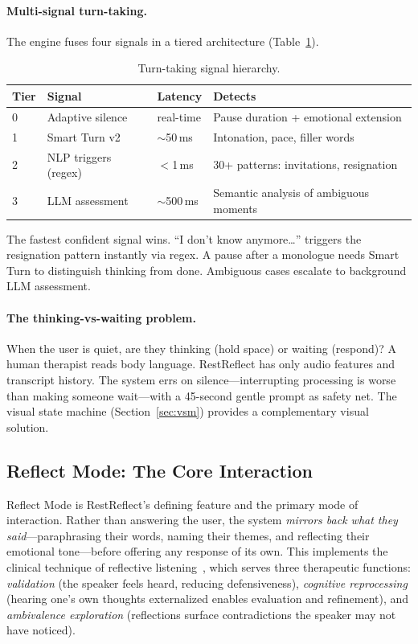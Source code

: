 \documentclass{article}
\begin{document}
\paragraph{Multi-signal turn-taking.} The engine fuses four signals in a tiered architecture (Table~\ref{tab:signals}).

\begin{table}[h]
\centering
\small
\caption{Turn-taking signal hierarchy.}
\label{tab:signals}
\begin{tabular}{@{}llll@{}}
\toprule
Tier & Signal & Latency & Detects \\
\midrule
0 & Adaptive silence & real-time & Pause duration + emotional extension \\
1 & Smart Turn v2 & $\sim$50\,ms & Intonation, pace, filler words \\
2 & NLP triggers (regex) & $<$1\,ms & 30+ patterns: invitations, resignation \\
3 & LLM assessment & $\sim$500\,ms & Semantic analysis of ambiguous moments \\
\bottomrule
\end{tabular}
\end{table}

The fastest confident signal wins. ``I don't know anymore\ldots'' triggers the resignation pattern instantly via regex. A pause after a monologue needs Smart Turn to distinguish thinking from done. Ambiguous cases escalate to background LLM assessment.

\paragraph{The thinking-vs-waiting problem.} When the user is quiet, are they thinking (hold space) or waiting (respond)? A human therapist reads body language. RestReflect has only audio features and transcript history. The system errs on silence---interrupting processing is worse than making someone wait---with a 45-second gentle prompt as safety net. The visual state machine (Section~\ref{sec:vsm}) provides a complementary visual solution.

\subsection{Reflect Mode: The Core Interaction}

Reflect Mode is RestReflect's defining feature and the primary mode of interaction. Rather than answering the user, the system \emph{mirrors back what they said}---paraphrasing their words, naming their themes, and reflecting their emotional tone---before offering any response of its own. This implements the clinical technique of reflective listening~\citep{rogers1957necessary, miller2013motivational}, which serves three therapeutic functions: \emph{validation} (the speaker feels heard, reducing defensiveness), \emph{cognitive reprocessing} (hearing one's own thoughts externalized enables evaluation and refinement), and \emph{ambivalence exploration} (reflections surface contradictions the speaker may not have noticed).
\end{document}
